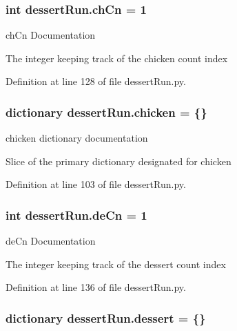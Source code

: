 \hypertarget{namespacedessertRun_a4190d0c5b39e025f4561b410c4d83414}{
\subsubsection[{ch\-Cn}]{\setlength{\rightskip}{0pt plus 5cm}int dessert\-Run.\-ch\-Cn = 1}}\label{namespacedessertRun_a4190d0c5b39e025f4561b410c4d83414}


ch\-Cn Documentation 

The integer keeping track of the chicken count index 

Definition at line 128 of file dessert\-Run.\-py.

\hypertarget{namespacedessertRun_a14b8eea3f8b40883b46cf609bce3d986}{
\subsubsection[{chicken}]{\setlength{\rightskip}{0pt plus 5cm}dictionary dessert\-Run.\-chicken = \{\}}}\label{namespacedessertRun_a14b8eea3f8b40883b46cf609bce3d986}


chicken dictionary documentation 

Slice of the primary dictionary designated for chicken 

Definition at line 103 of file dessert\-Run.\-py.

\hypertarget{namespacedessertRun_aac09394d5f6a1b906693f7ec37a3f98c}{
\subsubsection[{de\-Cn}]{\setlength{\rightskip}{0pt plus 5cm}int dessert\-Run.\-de\-Cn = 1}}\label{namespacedessertRun_aac09394d5f6a1b906693f7ec37a3f98c}


de\-Cn Documentation 

The integer keeping track of the dessert count index 

Definition at line 136 of file dessert\-Run.\-py.

\hypertarget{namespacedessertRun_a0fdf1938fbeb3dd0c2bbbec35947d482}{
\subsubsection[{dessert}]{\setlength{\rightskip}{0pt plus 5cm}dictionary dessert\-Run.\-dessert = \{\}}}\label{namespacedessertRun_a0fdf1938fbeb3dd0c2bbbec35947d482}


